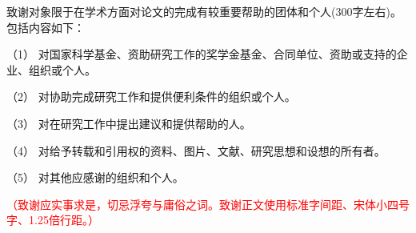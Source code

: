 

\begin{ack}

致谢对象限于在学术方面对论文的完成有较重要帮助的团体和个人(300字左右)。包括内容如下：

（1）	对国家科学基金、资助研究工作的奖学金基金、合同单位、资助或支持的企业、组织或个人。

（2）	对协助完成研究工作和提供便利条件的组织或个人。

（3）	对在研究工作中提出建议和提供帮助的人。

（4）	对给予转载和引用权的资料、图片、文献、研究思想和设想的所有者。

（5）	对其他应感谢的组织和个人。

\textcolor{red}{（致谢应实事求是，切忌浮夸与庸俗之词。致谢正文使用标准字间距、宋体小四号字、1.25倍行距。）}
\end{ack}

